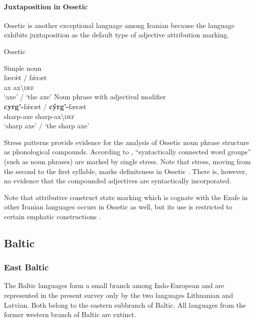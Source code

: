 \paragraph{Juxtaposition in Ossetic}
Ossetic is another exceptional language among Iranian because the language exhibits juxtaposition as the default type of adjective attribution marking.
\begin{exe}
\label{ossetic attrcomp}
\ex \rm{Ossetic \citep[12]{abaev1964}}
\begin{xlist}
\ex \rm{Simple noun}\\
\gll	færǽt / fǽræt\\
	ax { } ax\textbackslash\textsc{def}\\
\glt	‘axe’ / ‘the axe’
\ex \rm{Noun phrase with adjectival modifier}\\
\gll	\textbf{cyrg'-}fǽræt / \textbf{cýrg'-}færæt\\
	sharp-axe { } sharp-ax\textbackslash\textsc{def}\\
\glt	‘sharp axe’ / ‘the sharp axe’
\end{xlist}
\end{exe}
Stress patterns provide evidence for the analysis of Ossetic noun phrase structure as phonological compounds. According to \citet[10]{abaev1964}, “syntactically connected word groups” (such as noun phrases) are marked by single stress. Note that stress, moving from the second to the first syllable, marks definiteness in Ossetic \citep[12]{abaev1964}. There is, however, no evidence that the compounded adjectives are syntactically incorporated.

Note that attributive construct state marking which is cognate with the Ezafe in other Iranian languages occurs in Ossetic as well, but its use is restricted to certain emphatic constructions \cite[467]{thodarson1989}.

\subsection{Baltic} \label{baltic synchr}
\subsubsection{East Baltic}
The Baltic languages form a small branch among Indo-European and are represented in the present survey only by the two languages Lithuanian and Latvian. Both belong to the eastern subbranch of Baltic. All languages from the former western branch of Baltic are extinct.

